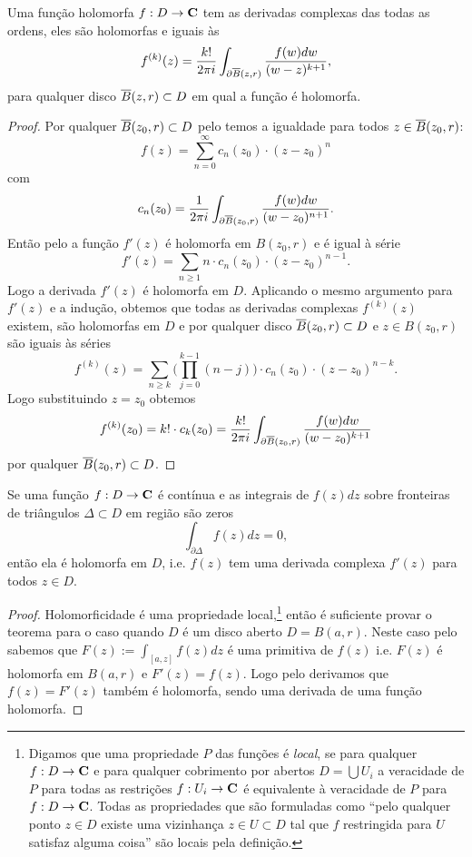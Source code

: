 \begin{teorema}
\label{t:hol-bihol}
Uma função holomorfa $f : D \to \mathbf{C}$ 
tem as derivadas complexas das todas as ordens, eles são holomorfas e iguais às
\begin{equation}
f^{(k)}(z) = \frac{k!}{2\pi i} \int_{\partial \overline{B}(z,r)} \frac{f(w) dw}{(w-z)^{k+1}},
\end{equation}
para qualquer disco $\overline{B}(z,r) \subset D$ em qual a função é holomorfa.
\end{teorema}
\begin{proof}
Por qualquer $\overline{B}(z_0,r) \subset D$ pelo  temos a igualdade para 
todos $z\in \overline{B}(z_0,r)$:
\[ f(z) = \sum_{n=0}^\infty c_n(z_0) \cdot (z-z_0)^n \]
com
\[ c_n(z_0) = \frac{1}{2\pi i} \int_{\partial \overline{B}(z_0,r)} \frac{f(w) dw}{(w-z_0)^{n+1}}. \]
Então pelo  a função $f'(z)$ é holomorfa em $B(z_0,r)$
e é igual à série
\[ f'(z) = \sum_{n\geq 1} n \cdot c_n(z_0) \cdot (z-z_0)^{n-1}. \]
Logo a derivada $f'(z)$ é holomorfa em $D$.
Aplicando o mesmo argumento para $f'(z)$ e a indução, obtemos que todas as derivadas complexas $f^{(k)}(z)$
existem, são holomorfas em $D$ e por qualquer disco $\overline{B}(z_0,r) \subset D$ e $z\in B(z_0,r)$
são iguais às séries
\[ f^{(k)}(z) = \sum_{n\geq k} \big(\prod_{j=0}^{k-1} (n-j)\big) \cdot c_n(z_0) \cdot (z-z_0)^{n-k} .\]
Logo substituindo $z=z_0$ obtemos
\[ f^{(k)}(z_0) = k! \cdot c_k(z_0) = \frac{k!}{2\pi i} \int_{\partial \overline{B}(z_0,r)} \frac{f(w) dw}{(w-z_0)^{k+1}} \]
por qualquer $\overline{B}(z_0,r) \subset D$.
\end{proof}

\begin{teorema}[Morera]
\label{t:morera}
Se uma função $f: D \to \mathbf{C}$ é contínua e as integrais de $f(z) dz$ sobre
fronteiras de triângulos $\Delta \subset D$ em região são zeros
\[ \int_{\partial \Delta} f(z) dz = 0, \]
então ela é holomorfa em $D$, i.e. $f(z)$ tem uma derivada complexa $f'(z)$ para todos $z\in D$.
\end{teorema}
\begin{proof}
Holomorficidade é uma propriedade local,\footnote{Digamos que uma propriedade $P$ das funções é \emph{local},
se para qualquer $f : D \to \mathbf{C}$ e para qualquer cobrimento por abertos $D = \bigcup U_i$
a veracidade de $P$ para todas as restrições $f : U_i \to \mathbf{C}$
é equivalente à veracidade de $P$ para $f : D \to \mathbf{C}$.
Todas as propriedades que são formuladas como ``pelo qualquer ponto $z\in D$
existe uma vizinhança $z \in U \subset D$ tal que $f$ restringida para $U$
satisfaz alguma coisa'' são locais pela definição.}
então é suficiente provar o teorema para o caso
quando $D$ é um disco aberto $D = B(a,r)$. Neste caso pelo 
sabemos que $F(z) := \int_{[a,z]} f(z) dz$ é uma primitiva de $f(z)$ i.e.
$F(z)$ é holomorfa em $B(a,r)$ e $F'(z) = f(z)$.
Logo pelo  derivamos que $f(z) = F'(z)$ também é holomorfa,
sendo uma derivada de uma função holomorfa.
\end{proof}

